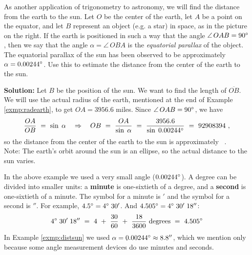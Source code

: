 \begin{exmp}\label{exmp:distsun}
\noindent As another application of trigonometry to astronomy, we will find the distance from the earth
 to the sun. Let $O$ be the center of the earth, let $A$ be a point on the equator, and let $B$
 represent an object (e.g. a star) in space, as in the picture on the right. If the earth is
 positioned in such a way that the angle $\angle\,OAB = 90^\circ$, then we say that the angle
 $\alpha = \angle\,OBA$ is the \emph{equatorial parallax} of the object.
 The equatorial parallax of the sun has been observed to be approximately $\alpha =
 0.00244^\circ$. Use this to estimate the distance from the center of the earth to the
 sun.\vspace{1mm}
 \par\noindent\textbf{Solution:} Let $B$ be the position of the sun. We want to find the length of
 $\overline{OB}$. We will use the actual radius of the earth, mentioned at the end of
 Example \ref{exmp:radearth}, to get $OA = 3956.6$ miles. Since $\angle\,OAB = 90^\circ$, we have
 \begin{displaymath}
  \frac{OA}{OB} ~=~ \sin\;\alpha \quad\Rightarrow\quad OB ~=~ \frac{OA}{\sin\;\alpha} ~=~
   \frac{3956.6}{\sin\;0.00244^\circ} ~=~ 92908394 ~,
 \end{displaymath}%
 so the distance from the center of the earth to the sun is approximately
 ~.\\Note: The
 earth's orbit around the sun is an ellipse, so the actual distance to the sun varies.
\end{exmp}\vspace{-3mm}
\divider
\vspace{1mm}

In the above example we used a very small angle ($0.00244^\circ$). A degree can be divided into
smaller units: a \textbf{minute} is one-sixtieth of a degree, and a
\textbf{second} is one-sixtieth of a minute. The symbol for a minute is $'$ and the
symbol for a second is $''$. For example, $4.5^\circ = 4^\circ\;30'$. And
$4.505^\circ = 4^\circ\;30'\;18''$:
\begin{displaymath}
 4^\circ\;30'\;18'' ~=~ 4 ~+~ \frac{30}{60} ~+~ \frac{18}{3600} ~\text{degrees} ~=~ 4.505^\circ
\end{displaymath}
In Example \ref{exmp:distsun} we used $\alpha = 0.00244^\circ \approx 8.8''$, which we mention
only because some angle measurement devices do use minutes and seconds.\vspace{-2mm}

